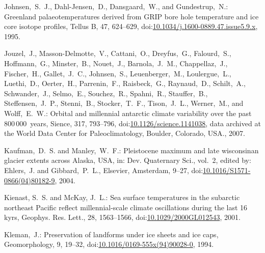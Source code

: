 \documentclass[tc, manuscript]{copernicus}
\begin{document}
\begin{thebibliography}{114}
Johnsen,~S.~J., Dahl-Jensen,~D., Dansgaard,~W., and Gundestrup,~N.: Greenland palaeotemperatures derived from GRIP bore hole temperature and ice core isotope profiles, Tellus B, 47, 624--629,
doi:\href{http://dx.doi.org/10.1034/j.1600-0889.47.issue5.9.x}{10.1034/j.1600-0889.47.issue5.9.x}, 1995.


Jouzel,~J., Masson-Delmotte,~V., Cattani,~O., Dreyfus,~G., Falourd,~S., Hoffmann,~G., Minster,~B., Nouet,~J., Barnola,~J.~M., Chappellaz,~J., Fischer,~H., Gallet,~J.~C., Johnsen,~S., Leuenberger,~M., Loulergue,~L., Luethi,~D., Oerter,~H., Parrenin,~F., Raisbeck,~G., Raynaud,~D., Schilt,~A., Schwander,~J., Selmo,~E., Souchez,~R., Spahni,~R., Stauffer,~B., Steffensen,~J.~P., Stenni,~B., Stocker,~T.~F., Tison,~J.~L., Werner,~M., and Wolff,~E.~W.: Orbital and millennial antarctic climate variability over the past 800\,000~years, Sience, 317, 793--796,
doi:\href{http://dx.doi.org/10.1126/science.1141038}{10.1126/science.1141038}, data archived at the World Data Center for Paleoclimatology, Boulder, Colorado, USA., 2007.


Kaufman,~D.~S. and Manley,~W.~F.: Pleistocene maximum and late wisconsinan glacier extents across Alaska, {USA}, in: Dev. Quaternary Sci., vol.~2,
edited by: Ehlers,~J. and Gibbard,~P.~L., Elsevier, Amsterdam, 9--27,
doi:\href{http://dx.doi.org/10.1016/S1571-0866(04)80182-9}{10.1016/S1571-0866(04)80182-9}, 2004.


Kienast, S.~S. and McKay, J.~L.: Sea surface temperatures in the subarctic northeast Pacific reflect millennial-scale climate oscillations during the last 16 kyrs, Geophys. Res. Lett., 28, 1563--1566,
doi:\href{http://dx.doi.org/10.1029/2000GL012543}{10.1029/2000GL012543}, 2001.


Kleman,~J.: Preservation of landforms under ice sheets and ice caps, Geomorphology, 9, 19--32,
doi:\href{http://dx.doi.org/10.1016/0169-555x(94)90028-0}{10.1016/0169-555x(94)90028-0}, 1994.



\end{thebibliography}
\end{document}
